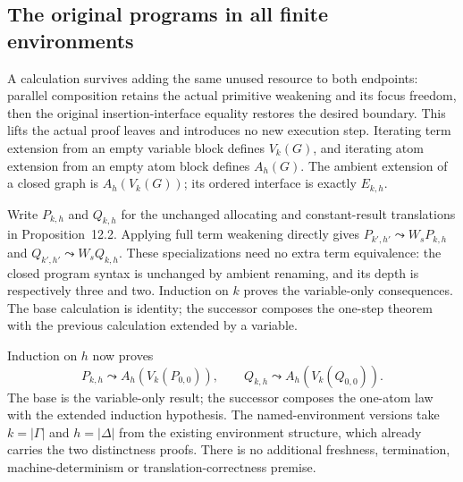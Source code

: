 
\subsection{The original programs in all finite environments}

A calculation survives adding the same unused resource to both endpoints:
parallel composition retains the actual primitive weakening and its focus
freedom, then the original insertion-interface equality restores the desired
boundary. This lifts the actual proof leaves and introduces no new execution
step. Iterating term extension from an empty variable block defines
$V_k(G)$, and iterating atom extension from an empty atom block defines $A_h(G)$.
The ambient extension of a closed graph is $A_h(V_k(G))$; its ordered interface
is exactly $E_{k,h}$.





Write $P_{k,h}$ and $Q_{k,h}$ for the unchanged allocating and constant-result
translations in Proposition~12.2. Applying full term weakening directly gives
$P_{k',h'}\leadsto W_sP_{k,h}$ and $Q_{k',h'}\leadsto W_sQ_{k,h}$.
These specializations need no extra term equivalence: the closed program
syntax is unchanged by ambient renaming, and its depth is respectively three
and two. Induction on $k$ proves the variable-only consequences. The base
calculation is identity; the successor composes the one-step theorem with
the previous calculation extended by a variable.





Induction on $h$ now proves
\[
 P_{k,h}\leadsto A_h(V_k(P_{0,0})),\qquad
 Q_{k,h}\leadsto A_h(V_k(Q_{0,0})).
\]
The base is the variable-only result; the successor composes the one-atom law
with the extended induction hypothesis. The named-environment versions take
$k=|\Gamma|$ and $h=|\Delta|$ from the existing environment structure, which
already carries the two distinctness proofs. There is no additional freshness,
termination, machine-determinism or translation-correctness premise.

